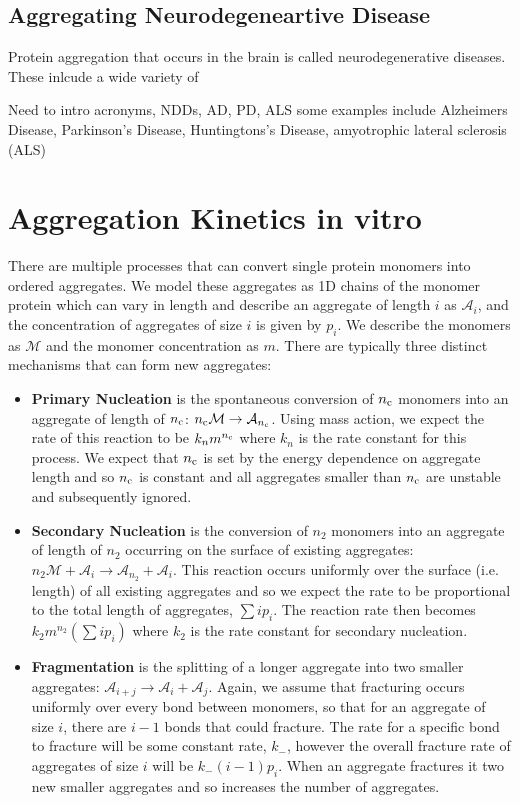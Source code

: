 \subsection{Aggregating Neurodegeneartive Disease}

Protein aggregation that occurs in the brain is called neurodegenerative diseases. These inlcude a wide variety of 

Need to intro acronyms, NDDs, AD, PD, ALS
some examples include Alzheimers Disease, Parkinson's Disease, Huntingtons's Disease, amyotrophic lateral sclerosis (ALS)

\section{Aggregation Kinetics in vitro}

There are multiple processes that can convert single protein monomers into ordered aggregates. We model these aggregates as 1D chains of the monomer protein which can vary in length and describe an aggregate of length $i$ as $\mathcal{A}_i$, and the concentration of aggregates of size $i$ is given by $p_i$. We describe the monomers as $\mathcal{M}$ and the monomer concentration as $m$. There are typically three distinct mechanisms that can form new aggregates:
\begin{itemize}
    \item \textbf{Primary Nucleation} is the spontaneous conversion of $n_{\mathrm{c}}$ monomers into an aggregate of length of $n_{\mathrm{c}}$: $n_{\mathrm{c}}\mathcal{M} \rightarrow \mathcal{A}_{n_{\mathrm{c}}}$. Using mass action, we expect the rate of this reaction to be $k_n m^{n_{\mathrm{c}}}$ where $k_n$ is the rate constant for this process. We expect that $n_{\mathrm{c}}$ is set by the energy dependence on aggregate length and so $n_{\mathrm{c}}$ is constant and all aggregates smaller than $n_{\mathrm{c}}$ are unstable and subsequently ignored.
    \item \textbf{Secondary Nucleation} is the conversion of $n_2$ monomers into an aggregate of length of $n_2$ occurring on the surface of existing aggregates: $n_2 \mathcal{M} + \mathcal{A}_{i} \rightarrow \mathcal{A}_{n_2} + \mathcal{A}_{i}$. This reaction occurs uniformly over the surface (i.e. length) of all existing aggregates and so we expect the rate to be proportional to the total length of aggregates, $\sum i p_i$. The reaction rate then becomes $k_2 m^{n_2}(\sum i p_i)$ where $k_2$ is the rate constant for secondary nucleation.
    \item \textbf{Fragmentation} is the splitting of a longer aggregate into two smaller aggregates: $\mathcal{A}_{i+j} \rightarrow \mathcal{A}_{i} + \mathcal{A}_{j}$. Again, we assume that fracturing occurs uniformly over every bond between monomers, so that for an aggregate of size $i$, there are $i-1$ bonds that could fracture. The rate for a specific bond to fracture will be some constant rate, $k_{-}$, however the overall fracture rate of aggregates of size $i$ will be $k_{-}(i-1)p_i$. When an aggregate fractures it two new smaller aggregates and so increases the number of aggregates.
\end{itemize}

